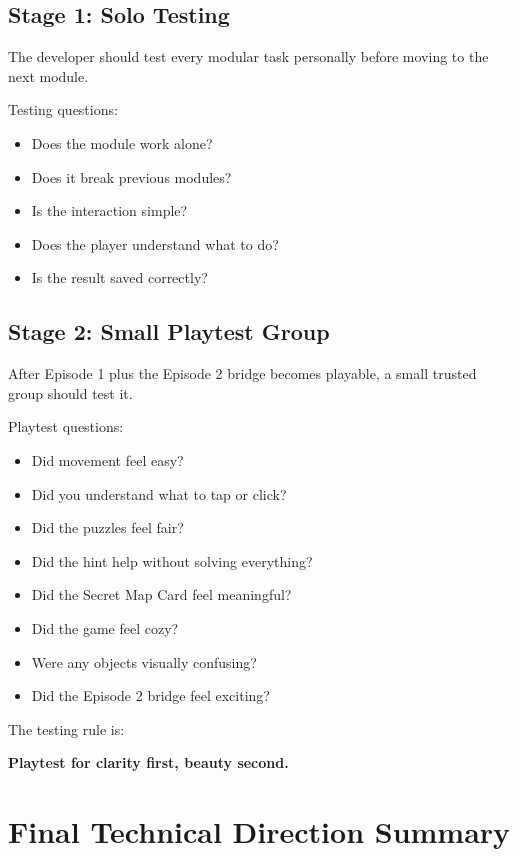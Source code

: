 \documentclass[12pt]{article}
\begin{document}
\subsection{Stage 1: Solo Testing}

The developer should test every modular task personally before moving to the next module.

Testing questions:

\begin{itemize}[leftmargin=*]
    \item Does the module work alone?
    \item Does it break previous modules?
    \item Is the interaction simple?
    \item Does the player understand what to do?
    \item Is the result saved correctly?
\end{itemize}

\subsection{Stage 2: Small Playtest Group}

After Episode 1 plus the Episode 2 bridge becomes playable, a small trusted group should test it.

Playtest questions:

\begin{itemize}[leftmargin=*]
    \item Did movement feel easy?
    \item Did you understand what to tap or click?
    \item Did the puzzles feel fair?
    \item Did the hint help without solving everything?
    \item Did the Secret Map Card feel meaningful?
    \item Did the game feel cozy?
    \item Were any objects visually confusing?
    \item Did the Episode 2 bridge feel exciting?
\end{itemize}

The testing rule is:

\begin{center}
\textbf{Playtest for clarity first, beauty second.}
\end{center}

\section{Final Technical Direction Summary}
\end{document}
